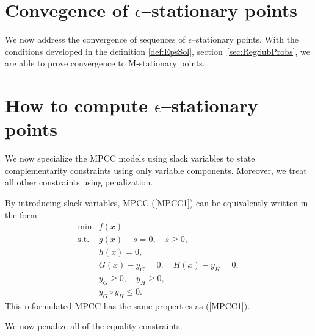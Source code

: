 \documentclass[12pt]{article}
\newcommand{\pref}[1]{(\ref{#1})}
\begin{document}
\section{Convegence of $\epsilon$--stationary points}
We now address the convergence of sequences of $\epsilon$--stationary points. With the conditions developed in the definition \ref{def:EpsSol}, section~\ref{sec:RegSubProbs}, we are able to prove convergence to M-stationary points.{


\section{How to compute $\epsilon$--stationary points}
We now specialize the MPCC models using slack variables to state complementarity constraints using only variable components. Moreover, we treat all other constraints using penalization. 

By introducing slack variables, MPCC \pref{MPCC1} can be equivalently written in the form
\begin{equation}\label{MPCC2b}
 \begin{array}{ll} 
      \min &f(x)\\
      \textrm{s.t.}
          &g(x)+s=0,\quad s\geq0,\\
          &h(x)=0,\\
          &G(x)-y_{G}=0,\quad H(x)-y_{H}=0,\\
          &y_{G}\geq0,\quad y_{H}\geq0,\\
          &y_{G}\circ y_{H}\leq 0.
       \end{array}
\end{equation}
This reformulated MPCC has the same properties as (\ref{MPCC1}).

We now penalize all of the equality constraints.

}
\end{document}
